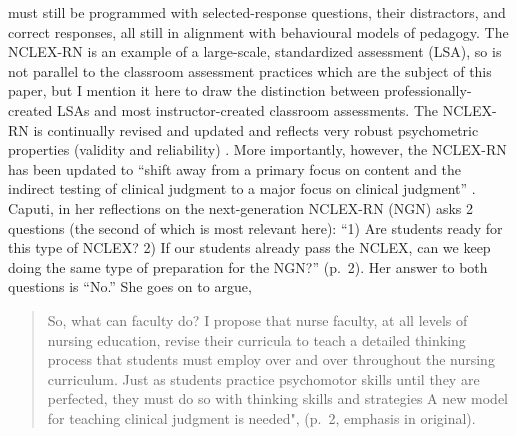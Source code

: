 \documentclass[
]{book}
\begin{document}
must still be programmed with selected-response questions, their distractors, and correct responses, all still in alignment with behavioural models of pedagogy. The NCLEX-RN is an example of a large-scale, standardized assessment (LSA), so is not parallel to the classroom assessment practices which are the subject of this paper, but I mention it here to draw the distinction between professionally-created LSAs and most instructor-created classroom assessments. The NCLEX-RN is continually revised and updated and reflects very robust psychometric properties (validity and reliability) \citep{smithglasgowStandardizedTestingNursing2019}. More importantly, however, the NCLEX-RN has been updated to ``shift away from a primary focus on content and the indirect testing of clinical judgment to a major focus on clinical judgment'' \citep[p.~2]{caputiReflectionsNextGeneration2019}. Caputi, in her reflections on the next-generation NCLEX-RN (NGN) asks 2 questions (the second of which is most relevant here): ``1) Are students ready for this type of NCLEX? 2) If our students already pass the NCLEX, can we keep doing the same type of preparation for the NGN?'' (p.~2). Her answer to both questions is ``No.'' She goes on to argue,

\begin{quote}
So, what can faculty do? I propose that nurse faculty, at all levels of nursing education, revise their curricula to teach a detailed thinking process that students must employ over and over throughout the nursing curriculum. Just as students practice psychomotor skills until they are perfected, they must do so with thinking skills and strategies A new model for teaching clinical judgment is needed", (p.~2, emphasis in original).
\end{quote}
\end{document}
